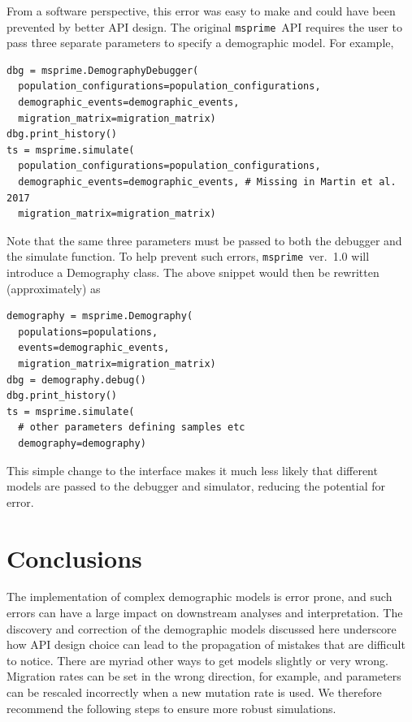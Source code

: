 \documentclass{article}
\newcommand{\msprime}[0]{\texttt{msprime}}
\begin{document}
From a software perspective, this error was easy to make
and could have been prevented by better API design.
The original \msprime\ API requires the user to pass
three separate parameters to specify a demographic model. For example,
\begin{Verbatim}[xleftmargin=.5in]
dbg = msprime.DemographyDebugger(
  population_configurations=population_configurations,
  demographic_events=demographic_events,
  migration_matrix=migration_matrix)
dbg.print_history()
ts = msprime.simulate(
  population_configurations=population_configurations,
  demographic_events=demographic_events, # Missing in Martin et al. 2017
  migration_matrix=migration_matrix)
\end{Verbatim}
Note that the same three parameters must be passed to both the debugger
and the simulate function.
To help prevent such errors,
\msprime~ver.~1.0 will introduce a Demography class. The above
snippet would then be rewritten (approximately) as
\begin{Verbatim}[xleftmargin=.5in]
demography = msprime.Demography(
  populations=populations,
  events=demographic_events,
  migration_matrix=migration_matrix)
dbg = demography.debug()
dbg.print_history()
ts = msprime.simulate(
  # other parameters defining samples etc
  demography=demography)
\end{Verbatim}
This simple change to the interface makes it much less likely
that different models are passed to the debugger and simulator,
reducing the potential for error.

\section*{Conclusions}

The implementation of complex demographic models is error prone, and such errors
can have a large impact on downstream analyses and interpretation.
The discovery and correction of the demographic models discussed here underscore
how API design choice can lead to the propagation of mistakes that are difficult to notice.
There are myriad other ways to get models slightly or very wrong. Migration
rates can be set in the wrong direction, for example, and parameters can be
rescaled incorrectly when a new mutation rate is used.
We therefore recommend the following steps to ensure more robust simulations.
\end{document}
